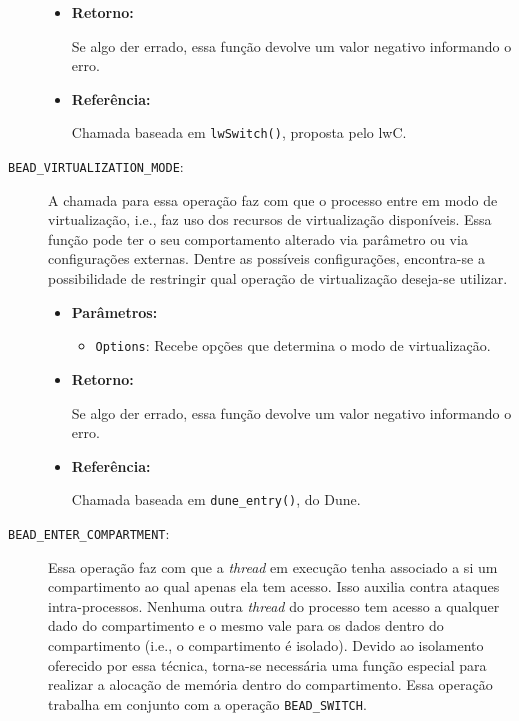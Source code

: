 \begin{description}
\begin{itemize}
    \item \textbf{Retorno:}

Se algo der errado, essa função devolve um valor negativo informando o erro.

    \item \textbf{Referência:}

Chamada baseada em \texttt{lwSwitch()}, proposta pelo lwC.

  \end{itemize}

  \item [\texttt{BEAD\_VIRTUALIZATION\_MODE}:]

A chamada para essa operação faz com que o processo entre em modo de
virtualização, i.e., faz uso dos recursos de virtualização disponíveis. Essa função pode ter o seu comportamento alterado via parâmetro ou via
configurações externas. Dentre as possíveis configurações, encontra-se a
possibilidade de restringir qual operação de virtualização deseja-se utilizar.

  \begin{itemize}
    \item \textbf{Parâmetros:}

    \begin{itemize}
    \item \texttt{Options}: Recebe opções que determina o modo de virtualização.
    \end{itemize}

    \item \textbf{Retorno:}

Se algo der errado, essa função devolve um valor negativo informando o erro.

    \item \textbf{Referência:}

Chamada baseada em \texttt{dune\_entry()}, do Dune.

  \end{itemize}

	\item [\texttt{BEAD\_ENTER\_COMPARTMENT}:]

Essa operação faz com que a \emph{thread} em execução tenha associado a si um
compartimento ao qual apenas ela tem acesso. Isso auxilia contra
ataques intra-processos. Nenhuma outra \emph{thread} do processo tem acesso a qualquer
dado do compartimento e o mesmo vale para os dados dentro do compartimento
(i.e., o compartimento é isolado). Devido ao isolamento oferecido por essa
técnica, torna-se necessária uma função especial para realizar a alocação de memória
dentro do compartimento. Essa operação trabalha em conjunto com a operação
\texttt{BEAD\_SWITCH}.


\end{description}
